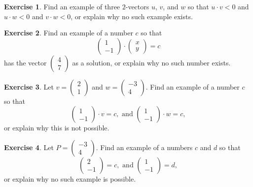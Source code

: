 \documentclass[11pt]{amsart}
\theoremstyle{definition}
\newtheorem{exercise}{Exercise}
\begin{document}
\begin{exercise}
Find an example of three $2$-vectors $u$, $v$, and $w$ so that $u\cdot v < 0$ and $u \cdot w < 0$ and $v \cdot w < 0$, or explain why no such example exists.
\end{exercise}

\begin{exercise}
Find an example of a number $c$ so that
\begin{equation*}
\begin{pmatrix} 1 \\ -1 \end{pmatrix} \cdot \begin{pmatrix} x \\ y \end{pmatrix} = c
\end{equation*}
has the vector $\left( \begin{smallmatrix} 4 \\ 7 \end{smallmatrix} \right)$ as a solution, or explain why no such number exists.
\end{exercise}

\begin{exercise}
Let $v = \left(\begin{smallmatrix} 2 \\ 1 \end{smallmatrix}\right)$ and $w = \left(\begin{smallmatrix} -3 \\ 4 \end{smallmatrix} \right)$. Find an example of a number $c$ so that
\begin{equation*}
\begin{pmatrix} 1 \\ -1 \end{pmatrix} \cdot v = c, \text{ and } \begin{pmatrix} 1 \\ -1 \end{pmatrix} \cdot w = c,
\end{equation*}
or explain why this is not possible.

\end{exercise}

\begin{exercise}
Let $P = \begin{pmatrix}-3 \\ 4 \end{pmatrix}$. Find an example of a numbers $c$ and $d$ so that
\begin{equation*}
\begin{pmatrix} 2 \\ -1 \end{pmatrix} = c, \text{ and }
\begin{pmatrix} 1 \\ -1 \end{pmatrix} = d,
\end{equation*}
or explain why no such example is possible.
\end{exercise}
\end{document}
